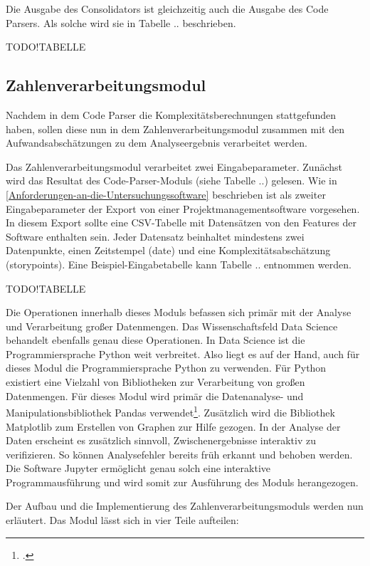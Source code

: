 Die Ausgabe des Consolidators ist gleichzeitig auch die Ausgabe des Code
Parsers. Als solche wird sie in Tabelle .. beschrieben.

TODO!TABELLE

\subsection{Zahlenverarbeitungsmodul}\label{Zahlenverarbeitungsmodul}

Nachdem in dem Code Parser die Komplexitätsberechnungen stattgefunden
haben, sollen diese nun in dem Zahlenverarbeitungsmodul zusammen mit den
Aufwandsabschätzungen zu dem Analyseergebnis verarbeitet werden.

Das Zahlenverarbeitungsmodul verarbeitet zwei Eingabeparameter. Zunächst
wird das Resultat des Code-Parser-Moduls (siehe Tabelle ..) gelesen. Wie
in \ref{Anforderungen-an-die-Untersuchungssoftware} beschrieben ist als zweiter Eingabeparameter der Export von
einer Projektmanagementsoftware vorgesehen. In diesem Export sollte eine
CSV-Tabelle mit Datensätzen von den Features der Software enthalten
sein. Jeder Datensatz beinhaltet mindestens zwei Datenpunkte, einen
Zeitstempel (date) und eine Komplexitätsabschätzung (storypoints). Eine
Beispiel-Eingabetabelle kann Tabelle .. entnommen werden.

TODO!TABELLE

Die Operationen innerhalb dieses Moduls befassen sich primär mit der
Analyse und Verarbeitung großer Datenmengen. Das Wissenschaftsfeld Data
Science behandelt ebenfalls genau diese Operationen. In Data Science ist
die Programmiersprache Python weit verbreitet.
Also liegt es auf der Hand, auch für dieses Modul die Programmiersprache
Python zu verwenden. Für Python existiert eine Vielzahl von Bibliotheken
zur Verarbeitung von großen Datenmengen. Für dieses Modul wird primär
die Datenanalyse- und Manipulationsbibliothek Pandas
verwendet\footcite[Vgl. ][]{PandasPythonData2022}. Zusätzlich wird
die Bibliothek Matplotlib zum Erstellen von Graphen zur Hilfe gezogen.
In der Analyse der Daten erscheint es zusätzlich sinnvoll,
Zwischenergebnisse interaktiv zu verifizieren. So können Analysefehler
bereits früh erkannt und behoben werden. Die Software Jupyter ermöglicht
genau solch eine interaktive Programmausführung und wird somit zur
Ausführung des Moduls herangezogen.

Der Aufbau und die Implementierung des Zahlenverarbeitungsmoduls werden
nun erläutert. Das Modul lässt sich in vier Teile aufteilen:

